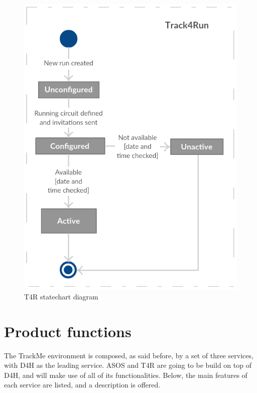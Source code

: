 \documentclass[hidelinks, 12pt]{report}
\begin{document}
	\begin{figure}[H]
		\centering
		\includegraphics[scale=0.55]{Diagrams/t4r_statechart.png}
		\caption[T4R statechart diagram]{T4R statechart diagram}
		\label{fig:t4r_statechart}
	\end{figure}
	
	\section{Product functions}
	The TrackMe environment is composed, as said before, by a set of three services, with D4H as the leading service. ASOS and T4R are going to be build on top of D4H, and will make use of all of its functionalities. Below, the main features of each service are listed, and a description is offered.
	
\end{document}
